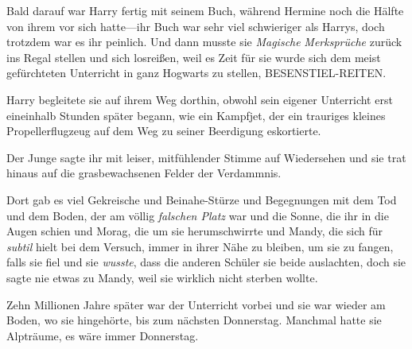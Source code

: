Bald darauf war Harry fertig mit seinem Buch, während Hermine noch die Hälfte von ihrem vor sich hatte—ihr Buch war sehr viel schwieriger als Harrys, doch trotzdem war es ihr peinlich. Und dann musste sie \emph{Magische} \emph{Merksprüche} zurück ins Regal stellen und sich losreißen, weil es Zeit für sie wurde sich dem meist gefürchteten Unterricht in ganz Hogwarts zu stellen, BESENSTIEL-REITEN.

Harry begleitete sie auf ihrem Weg dorthin, obwohl sein eigener Unterricht erst eineinhalb Stunden später begann, wie ein Kampfjet, der ein trauriges kleines Propellerflugzeug auf dem Weg zu seiner Beerdigung eskortierte.

Der Junge sagte ihr mit leiser, mitfühlender Stimme auf Wiedersehen und sie trat hinaus auf die grasbewachsenen Felder der Verdammnis.

Dort gab es viel Gekreische und Beinahe-Stürze und Begegnungen mit dem Tod und dem Boden, der am völlig \emph{falschen Platz} war und die Sonne, die ihr in die Augen schien und Morag, die um sie herumschwirrte und Mandy, die sich für \emph{subtil} hielt bei dem Versuch, immer in ihrer Nähe zu bleiben, um sie zu fangen, falls sie fiel und sie \emph{wusste}, dass die anderen Schüler sie beide auslachten, doch sie sagte nie etwas zu Mandy, weil sie wirklich nicht sterben wollte.

Zehn Millionen Jahre später war der Unterricht vorbei und sie war wieder am Boden, wo sie hingehörte, bis zum nächsten Donnerstag. Manchmal hatte sie Alpträume, es wäre immer Donnerstag.

